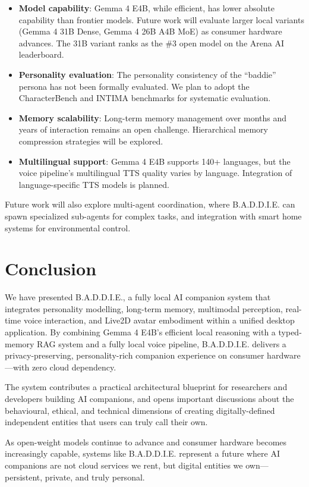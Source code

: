 \documentclass[sigconf]{acmart}
\begin{document}
\begin{itemize}
    \item \textbf{Model capability}: Gemma 4 E4B, while efficient, has lower absolute capability than frontier models. Future work will evaluate larger local variants (Gemma 4 31B Dense, Gemma 4 26B A4B MoE) as consumer hardware advances. The 31B variant ranks as the \#3 open model on the Arena AI leaderboard.
    \item \textbf{Personality evaluation}: The personality consistency of the ``baddie'' persona has not been formally evaluated. We plan to adopt the CharacterBench \cite{arxiv2403.08888} and INTIMA \cite{arxiv2508.09998} benchmarks for systematic evaluation.
    \item \textbf{Memory scalability}: Long-term memory management over months and years of interaction remains an open challenge. Hierarchical memory compression strategies \cite{arxiv2602.02007} will be explored.
    \item \textbf{Multilingual support}: Gemma 4 E4B supports 140+ languages, but the voice pipeline's multilingual TTS quality varies by language. Integration of language-specific TTS models is planned.
\end{itemize}

Future work will also explore multi-agent coordination, where B.A.D.D.I.E. can spawn specialized sub-agents for complex tasks, and integration with smart home systems for environmental control.

\section{Conclusion}

We have presented B.A.D.D.I.E., a fully local AI companion system that integrates personality modelling, long-term memory, multimodal perception, real-time voice interaction, and Live2D avatar embodiment within a unified desktop application. By combining Gemma 4 E4B's efficient local reasoning with a typed-memory RAG system and a fully local voice pipeline, B.A.D.D.I.E. delivers a privacy-preserving, personality-rich companion experience on consumer hardware---with zero cloud dependency.

The system contributes a practical architectural blueprint for researchers and developers building AI companions, and opens important discussions about the behavioural, ethical, and technical dimensions of creating digitally-defined independent entities that users can truly call their own.

As open-weight models continue to advance and consumer hardware becomes increasingly capable, systems like B.A.D.D.I.E. represent a future where AI companions are not cloud services we rent, but digital entities we own---persistent, private, and truly personal.



\end{document}

